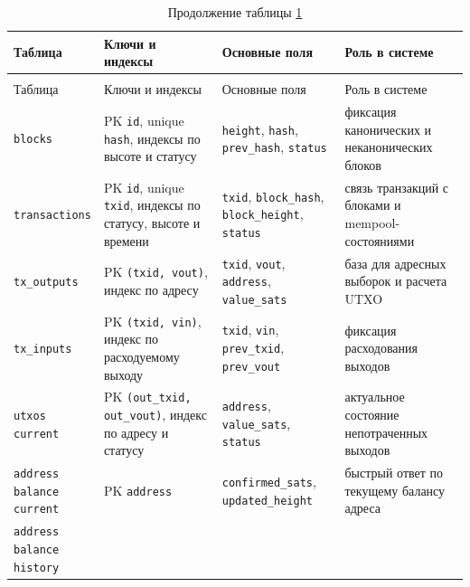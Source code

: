 \begin{scriptsize}
\setlength{\tabcolsep}{2pt}
\begin{longtable}{|p{}|p{}|p{}|p{}|}
    \caption{Ключевые элементы модели данных}\label{tab:data-model}\\ \hline
    Таблица & Ключи и индексы & Основные поля & Роль в системе \\ \hline
    \endfirsthead
    \caption*{Продолжение таблицы \ref{tab:data-model}}\\ \hline
    Таблица & Ключи и индексы & Основные поля & Роль в системе \\ \hline
    \endhead
    \hline
    \endfoot
    \hline
    \endlastfoot
    \texttt{blocks} &
    PK \texttt{id}, unique \texttt{hash}, индексы по высоте и статусу &
    \texttt{height}, \texttt{hash}, \texttt{prev\_hash}, \texttt{status} &
    фиксация канонических и неканонических блоков \\ \hline
    \texttt{transactions} &
    PK \texttt{id}, unique \texttt{txid}, индексы по статусу, высоте и времени &
    \texttt{txid}, \texttt{block\_hash}, \texttt{block\_height}, \texttt{status} &
    связь транзакций с блоками и mempool-состояниями \\ \hline
    \texttt{tx\_outputs} &
    PK \texttt{(txid, vout)}, индекс по адресу &
    \texttt{txid}, \texttt{vout}, \texttt{address}, \texttt{value\_sats} &
    база для адресных выборок и расчета UTXO \\ \hline
    \texttt{tx\_inputs} &
    PK \texttt{(txid, vin)}, индекс по расходуемому выходу &
    \texttt{txid}, \texttt{vin}, \texttt{prev\_txid}, \texttt{prev\_vout} &
    фиксация расходования выходов \\ \hline
    \shortstack[l]{\texttt{utxos}\\\texttt{current}} &
    PK \texttt{(out\_txid, out\_vout)}, индекс по адресу и статусу &
    \texttt{address}, \texttt{value\_sats}, \texttt{status} &
    актуальное состояние непотраченных выходов \\ \hline
    \shortstack[l]{\texttt{address}\\\texttt{balance}\\\texttt{current}} &
    PK \texttt{address} &
    \texttt{confirmed\_sats}, \texttt{updated\_height} &
    быстрый ответ по текущему балансу адреса \\ \hline
    \shortstack[l]{\texttt{address}\\\texttt{balance}\\\texttt{history}} &

\end{longtable}
\end{scriptsize}
